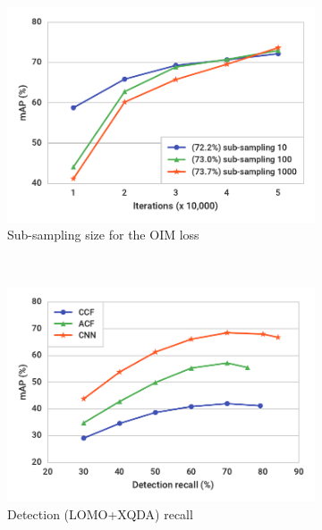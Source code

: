 \documentclass[10pt,twocolumn,letterpaper]{article}
\begin{document}
\begin{figure}[t]
\begin{center}
\begin{subfigure}[t]{0.32\linewidth}
  \includegraphics[width=\linewidth]{figures/subsampling.pdf}
  \caption{Sub-sampling size for the OIM loss}
  \label{fig:subsampling}
\end{subfigure}
~
\begin{subfigure}[t]{0.32\linewidth}
  \includegraphics[width=\linewidth]{figures/factor-recall.pdf}
  \caption{Detection (LOMO+XQDA) recall}
  \label{fig:factor-recall}
\end{subfigure}
~
\begin{subfigure}[t]{0.32\linewidth}

\end{subfigure}
\end{center}
\end{figure}
\end{document}
